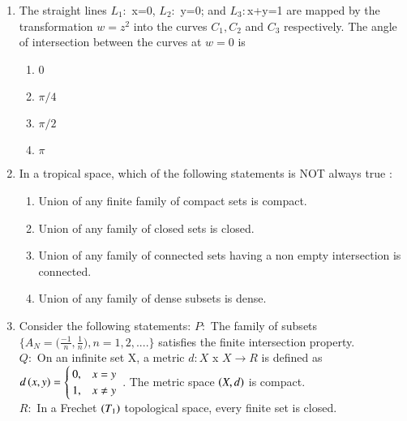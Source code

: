 \documentclass[journal]{IEEEtran}
\begin{document}
\begin{enumerate}[start=1]
	\item The straight lines $L_1:$ x=0, $L_2:$ y=0; and $L_3:$x+y=1 are mapped by the transformation $w=z^{2}$ into the curves $C_1,C_2$ and $C_3$ respectively. The angle of intersection between the curves at $w=0$ is 
\begin{multicols}{4}
\begin{enumerate}
    \item 0
    \item $\pi/4$
    \item $\pi/2$
    \item $\pi$
\end{enumerate}
\end{multicols}
    \item In a tropical space, which of the following statements is NOT always true :
    \begin{enumerate}
        \item Union of any finite family of compact sets is compact.
        \item Union of any family of closed sets is closed.
        \item Union of any family of connected sets having a non empty intersection is connected.
        \item Union of any family of dense subsets is dense.
    \end{enumerate}
\item Consider the following statements:
$P:$ The family of subsets $\Biggl\{ A_N=\bigg(\frac{-1}{n},\frac{1}{n}\bigg),n=1,2,....\Biggr\}$
satisfies the finite intersection property. \\

$Q:$ On an infinite set X, a metric $d: X$ x $X\rightarrow R$ is  defined as $d\left(x,y\right)=\begin{cases}
    0, &  x = y \\
    1, &  x \neq y\\
\end{cases}$ . The metric space $\left(X,d\right)$ is compact.\\

$R: $ In a Frechet $\left(T_1\right)$ topological space, every finite set is closed.\\


\end{enumerate}
\end{document}
